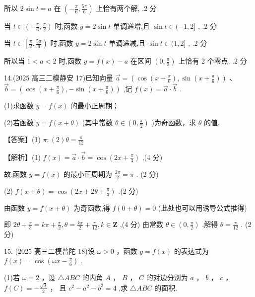 \documentclass[10pt]{article}
\begin{document}
所以 \(2\sin t = a\) 在 \(\left( {-\frac{\pi }{6},\frac{5\pi }{6}}\right)\) 上恰有两个解, .2 分

当 \(t \in  \left( {-\frac{\pi }{6},\frac{\pi }{2}}\right)\) 时,函数 \(y = 2\sin t\) 单调递增,且 \(\sin t \in  ( - 1,2\rbrack\) , .2 分

当 \(t \in  \left\lbrack  {\frac{\pi }{2},\frac{5\pi }{6}}\right)\) 时,函数 \(y = 2\sin t\) 单调递减,且 \(\sin t \in  (1,2\rbrack\) , .2 分

所以当 \(1 < a < 2\) 时,函数 \(y = f\left( x\right)  - a\) 在区间 \(\left( {0,\frac{\pi }{2}}\right)\) 上恰有 2 个零点. .2 分

14.(2025 高三二模静安 17)已知向量 \(\overrightarrow{a} = \left( {\cos \left( {x + \frac{\pi }{6}}\right) ,\sin \left( {x + \frac{\pi }{6}}\right) }\right)\) 、 \(\overrightarrow{b} = \left( {\cos \left( {x + \frac{\pi }{6}}\right) , - \sin \left( {x + \frac{\pi }{6}}\right) }\right)\) ,记 \(f\left( x\right)  = \overrightarrow{a} \cdot  \overrightarrow{b}\) .

(1)求函数 \(y = f\left( x\right)\) 的最小正周期；

(2)若函数 \(y = f\left( {x + \theta }\right)\) (其中常数 \(\theta  \in  \left( {0,\frac{\pi }{2}}\right)\) )为奇函数，求 \(\theta\) 的值.

【答案】(1) \(\pi ;\left( 2\right) \theta  = \frac{\pi }{12}\)

【解析】(1) \(f\left( x\right)  = \overrightarrow{a} \cdot  \overrightarrow{b} = \cos \left( {{2x} + \frac{\pi }{3}}\right)\) ,(4 分)

故,函数 \(y = f\left( x\right)\) 的最小正周期为 \(\frac{2\pi }{2} = \pi\) . (2 分)

(2) \(f\left( {x + \theta }\right)  = \cos \left( {{2x} + {2\theta } + \frac{\pi }{3}}\right)\) .(2 分)

由函数 \(y = f\left( {x + \theta }\right)\) 为奇函数,得 \(f\left( {0 + \theta }\right)  = 0\) (此处也可以用诱导公式推得)

即 \({2\theta } + \frac{\pi }{3} = {k\pi } + \frac{\pi }{2},\theta  = \frac{k\pi }{2} + \frac{\pi }{12},k \in  \mathbf{Z}\) ,(4 分) 由常数 \(\theta  \in  \left( {0,\frac{\pi }{2}}\right)\) ,解得 \(\theta  = \frac{\pi }{12}\) . (2 分)

15. (2025 高三二模普陀 18)设 \(\omega  > 0\) ，函数 \(y = f\left( x\right)\) 的表达式为 \(f\left( x\right)  = \cos \left( {{\omega x} - \frac{\pi }{6}}\right)\) .

(1)若 \(\omega  = 2\) ，设 \(\bigtriangleup  {ABC}\) 的内角 \(A\) ， \(B\) ， \(C\) 的对边分别为 \(a\) ， \(b\) ， \(c\) ， \(f\left( C\right)  =  - \frac{\sqrt{3}}{2}\) ， 且 \({c}^{2} - {a}^{2} - {b}^{2} = 4\) ,求 \(\bigtriangleup {ABC}\) 的面积.
\end{document}
